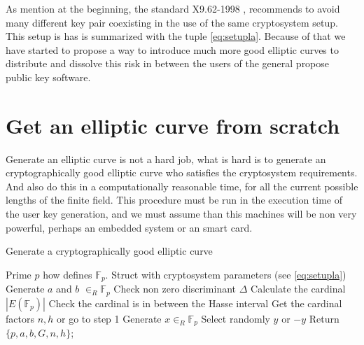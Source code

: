 \documentclass[10pt,a4paper,twoside]{llncs}
\newcommand{\Fp}{\ensuremath{\mathbb{F}_p}}%
\newcommand{\PaIe}{\ensuremath{\mathcal{O}_{E}}}%
\begin{document}
As mention at the beginning, the standard X9.62-1998 \cite{X9.62-1998}, recommends to avoid many different key pair coexisting in the use of the same cryptosystem setup. This setup is has is summarized with the tuple \ref{eq:setupla}. Because of that we have started to propose a way to introduce much more good elliptic curves to distribute and dissolve this risk in between the users of the general propose public key software.

\section{Get an elliptic curve from scratch \label{sec:scratch}}

Generate an elliptic curve is not a hard job, what is hard is to generate an cryptographically good elliptic curve who satisfies the cryptosystem requirements. And also do this in a computationally reasonable time, for all the current possible lengths of the finite field. This procedure must be run in the execution time of the user key generation, and we must assume than this machines will be non very powerful, perhaps an embedded system or an smart card.


\begin{algorithm}
  \caption{Generate a cryptographically good elliptic curve}\label{alg:scratch}
  \begin{algorithmic}[1]
    \REQUIRE Prime $p$ how defines \Fp.
    \ENSURE Struct with cryptosystem parameters (see \ref{eq:setupla})
    \REPEAT
      \STATE Generate $a$ and $b$ $\in_{R}$\Fp
      \STATE Check non zero discriminant $\Delta$
      \STATE Calculate the cardinal $\left| E\left(\mathbb{F}_{p}\right)\right|$ %
      \STATE Check the cardinal is in between the Hasse interval
      \STATE Get the cardinal factors $n,h$ or go to step 1
    \REPEAT
      \REPEAT
        \STATE Generate $x \in_{R}$\Fp
      \UNTIL{$\exists y \in $\Fp $\;$ s.t. $y=\sqrt{x^3 + a*x + b}$}
      \STATE Select randomly $y$ or $-y$
    \UNTIL{$[n]G=$\PaIe}
    \STATE Return $\{p,a,b,G,n,h\}$;
  \end{algorithmic}
\end{algorithm}%
\end{document}
